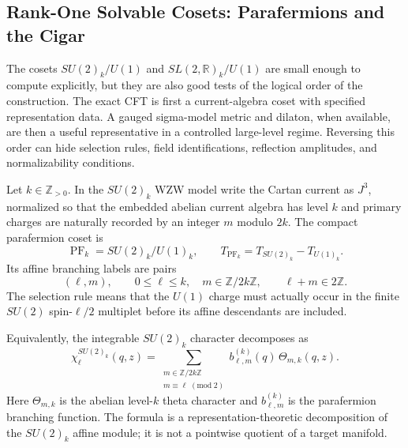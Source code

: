 \subsection{Rank-One Solvable Cosets: Parafermions and the Cigar}
\label{subsec:rank-one-solvable-cosets}

The cosets \(SU(2)_k/U(1)\) and \(SL(2,\mathbb R)_k/U(1)\) are small
enough to compute explicitly, but they are also good tests of the logical
order of the construction.  The exact CFT is first a current-algebra coset
with specified representation data.  A gauged sigma-model metric and
dilaton, when available, are then a useful representative in a controlled
large-level regime.  Reversing this order can hide selection rules, field
identifications, reflection amplitudes, and normalizability conditions.

\begin{definition}
\label{def:compact-parafermion-coset}
Let \(k\in\mathbb Z_{>0}\).  In the \(SU(2)_k\) WZW model write the Cartan
current as \(J^3\), normalized so that the embedded abelian current algebra
has level \(k\) and primary charges are naturally recorded by an integer
\(m\) modulo \(2k\).  The compact parafermion coset is
\[
  \operatorname{PF}_k
  =
  SU(2)_k/U(1)_k,
  \qquad
  T_{\operatorname{PF}_k}=T_{SU(2)_k}-T_{U(1)_k}.
\]
Its affine branching labels are pairs
\[
  (\ell,m),
  \qquad
  0\le \ell\le k,\quad m\in\mathbb Z/2k\mathbb Z,
  \qquad
  \ell+m\in 2\mathbb Z .
\]
The selection rule means that the \(U(1)\) charge must actually occur in
the finite \(SU(2)\) spin-\(\ell/2\) multiplet before its affine
descendants are included.
\end{definition}

Equivalently, the integrable \(SU(2)_k\) character decomposes as
\begin{equation}
  \chi^{SU(2)_k}_{\ell}(q,z)
  =
  \sum_{\substack{m\in\mathbb Z/2k\mathbb Z\\ m\equiv \ell\;(\mathrm{mod}\;2)}}
  b^{(k)}_{\ell,m}(q)\,
  \Theta_{m,k}(q,z).
  \label{eq:parafermion-branching}
\end{equation}
Here \(\Theta_{m,k}\) is the abelian level-\(k\) theta character and
\(b^{(k)}_{\ell,m}\) is the parafermion branching function.  The formula is
a representation-theoretic decomposition of the \(SU(2)_k\) affine module;
it is not a pointwise quotient of a target manifold.


